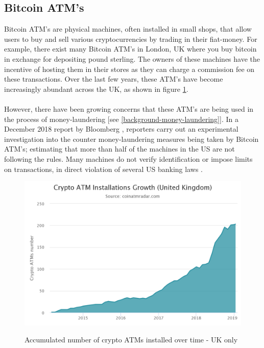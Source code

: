 \subsection{Bitcoin ATM's}

Bitcoin ATM's are physical machines, often installed in small shops, that allow users to buy and sell various cryptocurrencies by trading in their \gls{fiat-money}. For example, there exist many Bitcoin ATM's in London, UK where you buy bitcoin in exchange for depositing pound sterling. The owners of these machines have the incentive of hosting them in their stores as they can charge a commission fee on these transactions. Over the last few years, these ATM's have become increasingly abundant across the UK, as shown in figure \ref{fig:background-atm-growth}. 
\\\\
However, there have been growing concerns that these ATM's are being used in the process of \gls{money-laundering} [see \ref{background-money-laundering}]. In a December 2018 report by Bloomberg \cite{RefWorks:doc:5c4af4bfe4b0686b56fa4839}, reporters carry out an experimental investigation into the counter money-laundering measures being taken by Bitcoin ATM's; estimating that more than half of the machines in the US are not following the rules. Many machines do not verify identification or impose limits on transactions, in direct violation of several US banking laws \cite{RefWorks:doc:5c4af4bfe4b0686b56fa4839}. 

\begin{figure}[h!]
  \centering
  \includegraphics[width = 15cm]{./figures/atm-installs-uk}\\[0.5cm] 
  \caption{Accumulated number of crypto ATMs installed over time - UK only \protect \footnotemark}
  \label{fig:background-atm-growth}
\end{figure}


